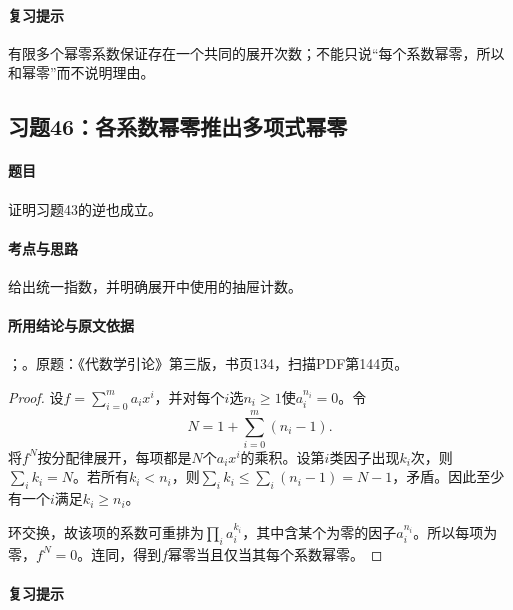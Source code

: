 \paragraph{复习提示}

有限多个幂零系数保证存在一个共同的展开次数；不能只说“每个系数幂零，所以和幂零”而不说明理由。



\subsection{习题46：各系数幂零推出多项式幂零}

\label{ex:3:46}

\paragraph{题目}

证明习题43的逆也成立。

\paragraph{考点与思路}

给出统一指数，并明确展开中使用的抽屉计数。

\paragraph{所用结论与原文依据}

；。原题：《代数学引论》第三版，书页134，扫描PDF第144页。


\begin{proof}

设$f=\sum_{i=0}^m a_ix^i$，并对每个$i$选$n_i\ge1$使$a_i^{n_i}=0$。令
\[
N=1+\sum_{i=0}^m(n_i-1).
\]
将$f^N$按分配律展开，每项都是$N$个$a_ix^i$的乘积。设第$i$类因子出现$k_i$次，则$\sum_i k_i=N$。若所有$k_i<n_i$，则$\sum_i k_i\le\sum_i(n_i-1)=N-1$，矛盾。因此至少有一个$i$满足$k_i\ge n_i$。

环交换，故该项的系数可重排为$\prod_i a_i^{k_i}$，其中含某个为零的因子$a_i^{n_i}$。所以每项为零，$f^N=0$。连同，得到$f$幂零当且仅当其每个系数幂零。

\end{proof}

\paragraph{复习提示}

